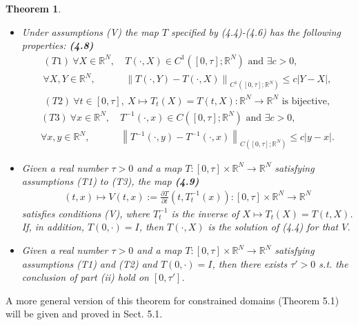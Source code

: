 \documentclass{book}
\numberwithin{equation}{section}
\newtheorem{theorem}{Theorem}[section]
\begin{document}
\begin{enumerate}
    \begin{theorem}
        \begin{itemize}
            \item[(i)] Under assumptions (V) the map $T$ specified by (4.4)-(4.6) has the following properties: \textbf{(4.8)}
            \begin{align*}
                (T1)\ \forall X\in\mathbb{R}^N,\ &T(\cdot,X)\in C^1\left([0,\tau];\mathbb{R}^N\right) \mbox{ and } \exists c > 0,\\
                \forall X,Y\in\mathbb{R}^N,\ &\left\|T(\cdot,Y) - T(\cdot,X)\right\|_{C^1\left([0,\tau];\mathbb{R}^N\right)}\le c\left|Y - X\right|,
            \end{align*}
            \begin{align*}
                (T2)\ \forall t\in[0,\tau],\ X\mapsto T_t(X) = T(t,X):\mathbb{R}^N\to\mathbb{R}^N \mbox{ is bijective},
            \end{align*}
            \begin{align*}
                (T3)\ \forall x\in\mathbb{R}^N,\ &T^{-1}(\cdot,x)\in C\left([0,\tau];\mathbb{R}^N\right) \mbox{ and } \exists c > 0,\\
                \forall x,y\in\mathbb{R}^N,\ &\left\|T^{-1}(\cdot,y) - T^{-1}(\cdot,x)\right\|_{C\left([0,\tau];\mathbb{R}^N\right)}\le c\left|y - x\right|.
            \end{align*}
            \item[(ii)] Given a real number $\tau > 0$ and a map $T:[0,\tau]\times\mathbb{R}^N\to\mathbb{R}^N$ satisfying assumptions (T1) to (T3), the map \textbf{(4.9)}
            \begin{align*}
                (t,x)\mapsto V(t,x) := \frac{\partial T}{\partial t}\left(t,T_t^{-1}(x)\right):[0,\tau]\times\mathbb{R}^N\to\mathbb{R}^N
            \end{align*}
            satisfies conditions (V), where $T_t^{-1}$ is the inverse of $X\mapsto T_t(X) = T(t,X)$. If, in addition, $T(0,\cdot) = I$, then $T(\cdot,X)$ is the solution of (4.4) for that $V$.
            \item[(iii)] Given a real number $\tau > 0$ and a map $T:[0,\tau]\times\mathbb{R}^N\to\mathbb{R}^N$ satisfying assumptions (T1) and (T2) and $T(0,\cdot) = I$, then there exists $\tau' > 0$ s.t. the conclusion of part (ii) hold on $[0,\tau']$.
        \end{itemize}
    \end{theorem}
    A more general version of this theorem for constrained domains (Theorem 5.1) will be given and proved in Sect. 5.1.
    

\end{enumerate}
\end{document}
